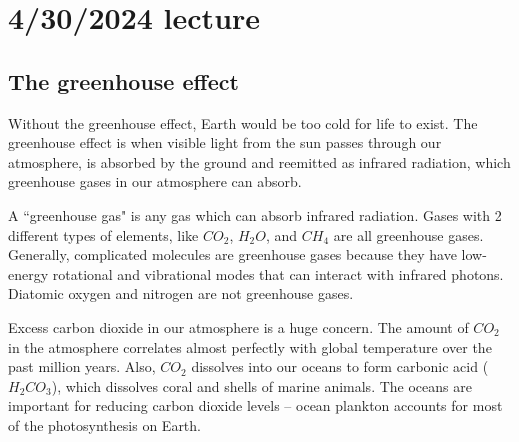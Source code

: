 \documentclass[class=article, crop=false]{standalone}
\begin{document}
\section{4/30/2024 lecture}
\subsection{The greenhouse effect}
Without the greenhouse effect, Earth would be too cold for life to exist. The greenhouse effect is when visible light from the sun passes through our atmosphere, is absorbed by the ground and reemitted as infrared radiation, which greenhouse gases in our atmosphere can absorb.
\par
A ``greenhouse gas" is any gas which can absorb infrared radiation. Gases with 2 different types of elements, like $CO_2$, $H_2O$, and $CH_4$ are all greenhouse gases. Generally, complicated molecules are greenhouse gases because they have low-energy rotational and vibrational modes that can interact with infrared photons. Diatomic oxygen and nitrogen are not greenhouse gases.
\par
Excess carbon dioxide in our atmosphere is a huge concern. The amount of $CO_2$ in the atmosphere correlates almost perfectly with global temperature over the past million years. Also, $CO_2$ dissolves into our oceans to form carbonic acid ($H_2CO_3$), which dissolves coral and shells of marine animals. The oceans are important for reducing carbon dioxide levels -- ocean plankton accounts for most of the photosynthesis on Earth.
\end{document}
